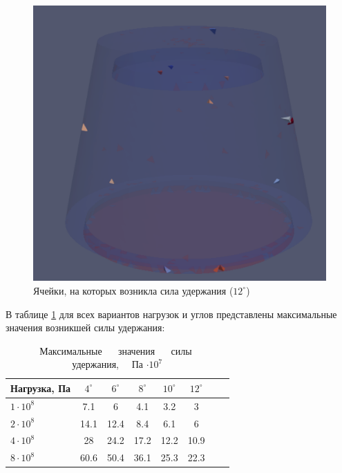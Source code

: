 \documentclass[a4paper, 14pt]{extreport}
\begin{document}
\begin{figure}[H]
	\center
	\includegraphics[scale=0.6]{pictures_diploma/push4-12deg.png}
	\caption{Ячейки, на которых возникла сила удержания ($12^{\circ}$)}
	\label{fig: push4-12deg}
\end{figure}

В таблице \ref{tab: table1} для всех вариантов нагрузок и 
углов представлены максимальные значения возникшей силы 
удержания:

\begin{table}[H]
\captionsetup{width=1.5\textwidth}
\centering
\caption{$\quad$Максимальные $\quad$ значения $\quad$ силы $\quad$ удержания,$\quad$  
Па $\cdot 10^7$}
\begin{tabular}{l*{6}{c}r}
Нагрузка, Па              & $4^{\circ}$ & $6^{\circ}$ & $8^{\circ}$ & $10^{\circ}$ & $12^{\circ}$ \\
\hline
$1 \cdot 10^8$ 	& 7.1 & 6 & 4.1 & 3.2 & 3  \\
$2 \cdot 10^8$     & 14.1 & 12.4 & 8.4 & 6.1 & 6  \\
$4 \cdot 10^8$     & 28 & 24.2 & 17.2 & 12.2 &  10.9  \\
$8 \cdot 10^8$     & 60.6 & 50.4 & 36.1 & 25.3 &  22.3  \\
\end{tabular}

\label{tab: table1}
\end{table}
\end{document}
